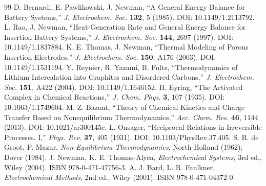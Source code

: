 \documentclass[11pt,a4paper]{article}
\begin{document}
\begin{thebibliography}{99}
 D. Bernardi, E. Pawlikowski, J. Newman, ``A General Energy Balance for Battery
  Systems,'' \emph{J. Electrochem. Soc.} \textbf{132}, 5 (1985). DOI: 10.1149/1.2113792.
 L. Rao, J. Newman, ``Heat-Generation Rate and General Energy Balance for Insertion
  Battery Systems,'' \emph{J. Electrochem. Soc.} \textbf{144}, 2697 (1997). DOI: 10.1149/1.1837884.
 K. E. Thomas, J. Newman, ``Thermal Modeling of Porous Insertion Electrodes,''
  \emph{J. Electrochem. Soc.} \textbf{150}, A176 (2003). DOI: 10.1149/1.1531194.
 Y. Reynier, R. Yazami, B. Fultz, ``Thermodynamics of Lithium Intercalation into
  Graphites and Disordered Carbons,'' \emph{J. Electrochem. Soc.} \textbf{151}, A422 (2004).
  DOI: 10.1149/1.1646152.
 H. Eyring, ``The Activated Complex in Chemical Reactions,'' \emph{J. Chem. Phys.}
  \textbf{3}, 107 (1935). DOI: 10.1063/1.1749604.
 M. Z. Bazant, ``Theory of Chemical Kinetics and Charge Transfer Based on
  Nonequilibrium Thermodynamics,'' \emph{Acc. Chem. Res.} \textbf{46}, 1144 (2013).
  DOI: 10.1021/ar300145c.
 L. Onsager, ``Reciprocal Relations in Irreversible Processes. I,'' \emph{Phys. Rev.}
  \textbf{37}, 405 (1931). DOI: 10.1103/PhysRev.37.405.
 S. R. de Groot, P. Mazur, \emph{Non-Equilibrium Thermodynamics},
  North-Holland (1962); Dover (1984).
 J. Newman, K. E. Thomas-Alyea, \emph{Electrochemical Systems}, 3rd ed., Wiley (2004).
  ISBN 978-0-471-47756-3.
 A. J. Bard, L. R. Faulkner, \emph{Electrochemical Methods}, 2nd ed., Wiley (2001).
  ISBN 978-0-471-04372-0.
\end{thebibliography}
\end{document}
